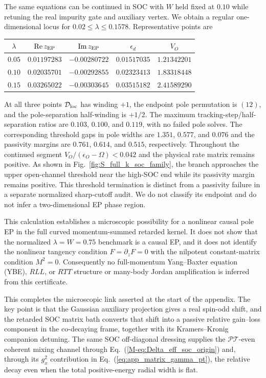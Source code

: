 \documentclass[%
  aps,prb,reprint,amsmath,amssymb,superscriptaddress,longbibliography,floatfix
]{revtex4-2}
\newcommand{\PT}{\mathcal{PT}}
\begin{document}
The same equations can be continued in SOC with $W$ held fixed at $0.10$
while retuning the real impurity gate and auxiliary vertex.  We obtain a
regular one-dimensional locus for
$0.02\leq\lambda\leq0.1578$.  Representative points are
\begin{center}
\begin{tabular}{@{}ccccc@{}}
\toprule
$\lambda$ & $\operatorname{Re}z_{\rm EP}$ & $\operatorname{Im}z_{\rm EP}$
& $\epsilon_d$ & $V_O$ \\
\midrule
$0.05$ & $0.01197283$ & $-0.00280722$ & $0.01517035$ & $1.21342201$ \\
$0.10$ & $0.02035701$ & $-0.00292855$ & $0.02323413$ & $1.83318448$ \\
$0.15$ & $0.03265022$ & $-0.00303645$ & $0.03515182$ & $2.41589290$ \\
\bottomrule
\end{tabular}
\end{center}
At all three points ${\cal D}_{\rm loc}$ has winding $+1$, the endpoint pole
permutation is $(12)$, and the pole-separation half-winding is $+1/2$.  The
maximum tracking-step/half-separation ratios are $0.103$, $0.100$, and
$0.119$, with no failed pole solves.  The corresponding threshold gaps in
pole widths are $1.351$, $0.577$, and $0.076$ and the passivity margins are
$0.761$, $0.614$, and $0.515$, respectively.  Throughout the continued segment
$V_O/(\epsilon_O-\Omega)<0.042$ and the physical rate matrix remains
positive.  As shown in Fig.~\ref{fig:S_full_k_soc_family}, the branch
approaches the upper open-channel threshold near the high-SOC end while its
passivity margin remains positive.  This threshold termination is distinct
from a passivity failure in a separate normalized sharp-cutoff audit.  We do
not classify its endpoint and do not infer a two-dimensional EP phase region.

This calculation establishes a microscopic possibility for a nonlinear
causal pole EP in the full curved momentum-summed retarded kernel.  It does
not show that the normalized $\lambda=W=0.75$ benchmark is a causal EP, and
it does not identify the nonlinear tangency condition
$F=\partial_zF=0$ with the nilpotent constant-matrix condition $M^2=0$.
Consequently no full-momentum Yang--Baxter equation (YBE), $RLL$, or
$RTT$ structure or many-body Jordan
amplification is inferred from this certificate.

This completes the microscopic link asserted at the start of the
appendix.  The key point is that the Gaussian auxiliary projection gives
a real spin-odd shift, and the retarded SOC matrix bath converts that shift
into a passive relative gain--loss component in the co-decaying frame,
together with its Kramers--Kronig companion detuning.  The same SOC
off-diagonal dressing supplies the $\PT$-even coherent mixing channel through
Eq.~(\ref{M-eq:Delta_eff_soc_origin}) and, through its $g_x^2$ contribution in
Eq.~(\ref{eq:app_matrix_gamma_pt}), the relative decay even when the total
positive-energy radial width is flat.
\end{document}
